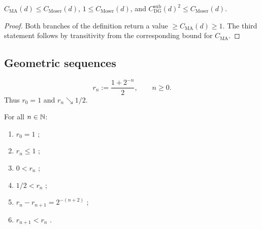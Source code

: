 \begin{lemma}
\label{lem:C_MoserAnchor_le_C_Moser}
\leanok
{}
$C_{\mathrm{MA}}(d) \leq C_{\mathrm{Moser}}(d)$, $1 \leq C_{\mathrm{Moser}}(d)$, and
$C_{\mathrm{DG}}^{\mathrm{sub}}(d)^2 \leq C_{\mathrm{Moser}}(d)$.
\end{lemma}

\begin{proof}
\leanok
{}

Both branches of the definition return a value $\geq C_{\mathrm{MA}}(d) \geq 1$.
The third statement follows by transitivity from the corresponding bound for
$C_{\mathrm{MA}}$.
\end{proof}

\subsection{Geometric sequences}

\begin{definition}
\label{def:moserRadius}
\leanok
\begin{equation*}
  r_n := \frac{1 + 2^{-n}}{2}, \qquad n \geq 0.
\end{equation*}
Thus $r_0 = 1$ and $r_n \searrow 1/2$.
\end{definition}

\begin{lemma}
\label{lem:moserRadius_zero}
\leanok
{}
For all $n \in \mathbb{N}$:
\begin{enumerate}
  \item $r_0 = 1$ ;
  \item $r_n \leq 1$ ;
  \item $0 < r_n$ ;
  \item $1/2 < r_n$ ;
  \item $r_n - r_{n+1} = 2^{-(n+2)}$ ;
  \item $r_{n+1} < r_n$ .
\end{enumerate}
\end{lemma}

